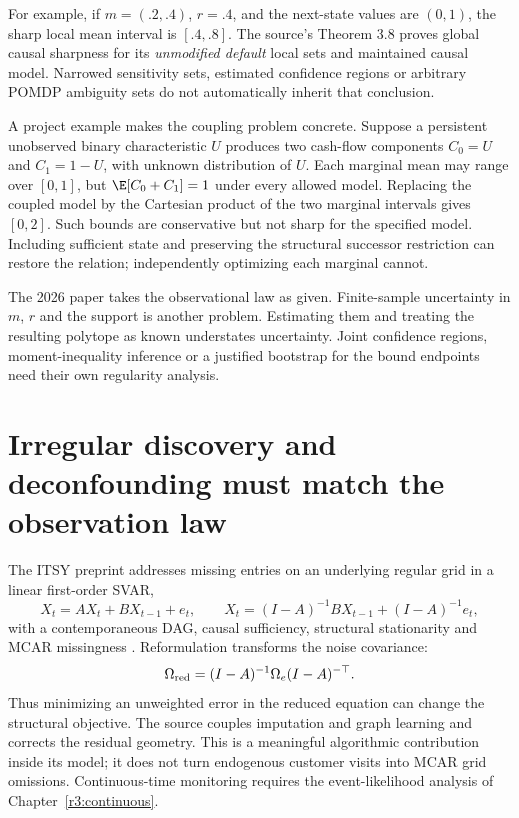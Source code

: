For example, if $m=(.2,.4)$, $r=.4$, and the next-state values are
$(0,1)$, the sharp local mean interval is $[.4,.8]$.
The source's Theorem 3.8 proves global causal sharpness for its
\emph{unmodified default} local sets and maintained causal model.
Narrowed sensitivity sets, estimated confidence regions or arbitrary
POMDP ambiguity sets do not automatically inherit that conclusion.

A project example makes the coupling problem concrete. Suppose a persistent
unobserved binary characteristic $U$ produces two cash-flow components
$C_0=U$ and $C_1=1-U$, with unknown distribution of $U$. Each marginal
mean may range over $[0,1]$, but $\E[C_0+C_1]=1$ under every allowed
model. Replacing the coupled model by the Cartesian product of the two
marginal intervals gives $[0,2]$. Such bounds are conservative but
not sharp for the specified model. Including sufficient state and
preserving the structural successor restriction can restore the relation;
independently optimizing each marginal cannot.

The 2026 paper takes the observational law as given. Finite-sample
uncertainty in $m$, $r$ and the support is another problem. Estimating them
and treating the resulting polytope as known understates uncertainty.
Joint confidence regions, moment-inequality inference or a justified
bootstrap for the bound endpoints need their own regularity analysis.

\section{Irregular discovery and deconfounding must match the observation law}
\label{r3:recent-discovery}

The ITSY preprint addresses missing entries on an underlying regular grid
in a linear first-order SVAR,
\[
 X_t=AX_t+BX_{t-1}+e_t,\qquad
 X_t=(I-A)^{-1}BX_{t-1}+(I-A)^{-1}e_t,
\]
with a contemporaneous DAG, causal sufficiency, structural stationarity
and MCAR missingness \citep[Sections 3--4]{itsy2026}. Reformulation
transforms the noise covariance:
\[
 \Omega_{\rm red}=(I-A)^{-1}\Omega_e(I-A)^{-\top}.
\]
Thus minimizing an unweighted error in the reduced equation can change
the structural objective. The source couples imputation and graph
learning and corrects the residual geometry. This is a meaningful
algorithmic contribution inside its model; it does not turn endogenous
customer visits into MCAR grid omissions. Continuous-time monitoring
requires the event-likelihood analysis of Chapter~\ref{r3:continuous}.

